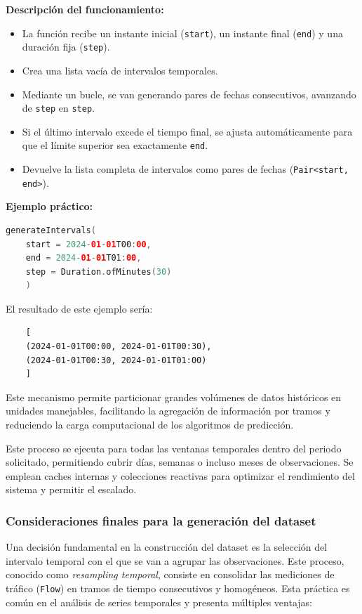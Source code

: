 \vspace{1em}
\noindent \textbf{Descripción del funcionamiento:}
\begin{itemize}
	\item La función recibe un instante inicial (\texttt{start}), un instante final (\texttt{end}) y una duración fija (\texttt{step}).
	\item Crea una lista vacía de intervalos temporales.
	\item Mediante un bucle, se van generando pares de fechas consecutivos, avanzando de \texttt{step} en \texttt{step}.
	\item Si el último intervalo excede el tiempo final, se ajusta automáticamente para que el límite superior sea exactamente \texttt{end}.
	\item Devuelve la lista completa de intervalos como pares de fechas (\texttt{Pair<start, end>}).
\end{itemize}

\vspace{1em}
\noindent \textbf{Ejemplo práctico:}
\begin{lstlisting}[language=Kotlin, caption={Ejemplo de uso con intervalos de 30 minutos}]
	generateIntervals(
	start = 2024-01-01T00:00,
	end = 2024-01-01T01:00,
	step = Duration.ofMinutes(30)
	)
\end{lstlisting}

\noindent El resultado de este ejemplo sería:
\begin{verbatim}
	[
	(2024-01-01T00:00, 2024-01-01T00:30),
	(2024-01-01T00:30, 2024-01-01T01:00)
	]
\end{verbatim}

Este mecanismo permite particionar grandes volúmenes de datos históricos en unidades manejables, facilitando la agregación de información por tramos y reduciendo la carga computacional de los algoritmos de predicción.

Este proceso se ejecuta para todas las ventanas temporales dentro del periodo solicitado, permitiendo cubrir días, semanas o incluso meses de observaciones. Se emplean caches internas y colecciones reactivas para optimizar el rendimiento del sistema y permitir el escalado.

\subsubsection{Consideraciones finales para la generación del dataset}

Una decisión fundamental en la construcción del dataset es la selección del intervalo temporal con el que se van a agrupar las observaciones. Este proceso, conocido como \textit{resampling temporal}, consiste en consolidar las mediciones de tráfico (\texttt{Flow}) en tramos de tiempo consecutivos y homogéneos. Esta práctica es común en el análisis de series temporales y presenta múltiples ventajas:

